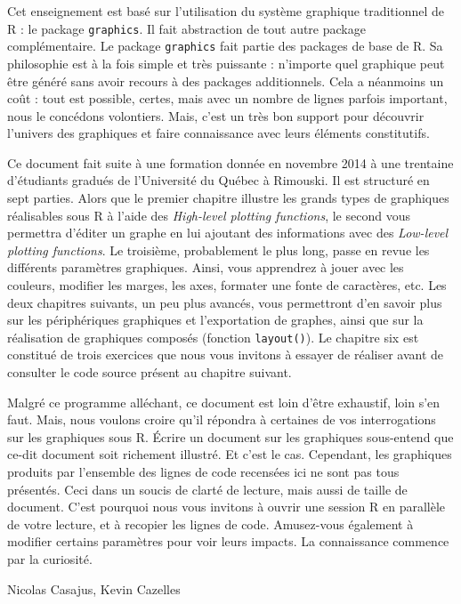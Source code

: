 \documentclass[]{article}
\begin{document}
Cet enseignement est basé sur l'utilisation du système graphique traditionnel de R : le package \texttt{graphics}. Il fait abstraction de tout autre package complémentaire. Le package \texttt{graphics} fait partie des packages de base de R. Sa philosophie est à la fois simple et très puissante : n'importe quel graphique peut être généré sans avoir recours à des packages additionnels. Cela a néanmoins un coût : tout est possible, certes, mais avec un nombre de lignes parfois important, nous le concédons volontiers. Mais, c'est un très bon support pour découvrir l'univers des graphiques et faire connaissance avec leurs éléments constitutifs.

Ce document fait suite à une formation donnée en novembre 2014 à une trentaine d'étudiants gradués de l'Université du Québec à Rimouski. Il est structuré en sept parties. Alors que le premier chapitre illustre les grands types de graphiques réalisables sous R à l'aide des \textit{High-level plotting functions}, le second vous permettra d'éditer un graphe en lui ajoutant des informations avec des \textit{Low-level plotting functions}. Le troisième, probablement le plus long, passe en revue les différents paramètres graphiques. Ainsi, vous apprendrez à jouer avec les couleurs, modifier les marges, les axes, formater une fonte de caractères, etc. Les deux chapitres suivants, un peu plus avancés, vous permettront d'en savoir plus sur les périphériques graphiques et l'exportation de graphes, ainsi que sur la réalisation de graphiques composés (fonction \texttt{layout()}). Le chapitre six est constitué de trois exercices que nous vous invitons à essayer de réaliser avant de consulter le code source présent au chapitre suivant.

Malgré ce programme alléchant, ce document est loin d'être exhaustif, loin s'en faut. Mais, nous voulons croire qu'il répondra à certaines de vos interrogations sur les graphiques sous R. Écrire un document sur les graphiques sous-entend que ce-dit document soit richement illustré. Et c'est le cas. Cependant, les graphiques produits par l'ensemble des lignes de code recensées ici ne sont pas tous présentés. Ceci dans un soucis de clarté de lecture, mais aussi de taille de document. C'est pourquoi nous vous invitons à ouvrir une session R en parallèle de votre lecture, et à recopier les lignes de code. Amusez-vous également à modifier certains paramètres pour voir leurs impacts. La connaissance commence par la curiosité.

Nicolas Casajus, Kevin Cazelles
\end{document}
